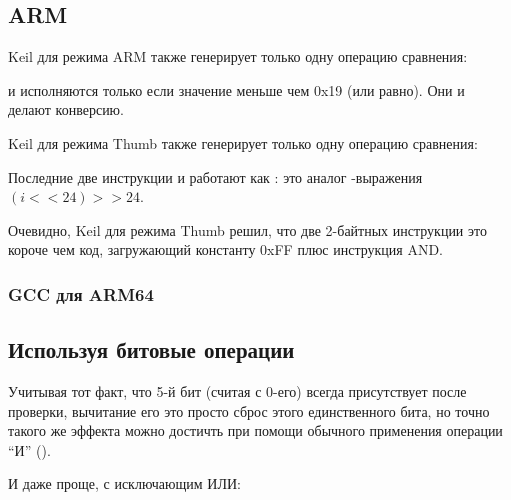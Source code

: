 \subsection{ARM}

\Optimizing Keil для режима ARM также генерирует только одну операцию сравнения:




 и  исполняются только если значение  меньше чем 0x19 (или равно).
Они и делают конверсию.

\Optimizing Keil для режима Thumb также генерирует только одну операцию сравнения:




Последние две инструкции  и  работают как :
это аналог \CCpp-выражения $(i<<24)>>24$.

Очевидно, Keil для режима Thumb решил, что две 2-байтных инструкции это короче чем код, загружающий
константу 0xFF плюс инструкция AND.

\subsubsection{GCC для ARM64}





\subsection{Используя битовые операции}
\label{toupper_bit}

Учитывая тот факт, что 5-й бит (считая с 0-его) всегда присутствует после проверки, вычитание его это просто
сброс этого единственного бита, но точно такого же эффекта можно достичть при помощи обычного применения операции
``И'' ().

И даже проще, с исключающим ИЛИ:

